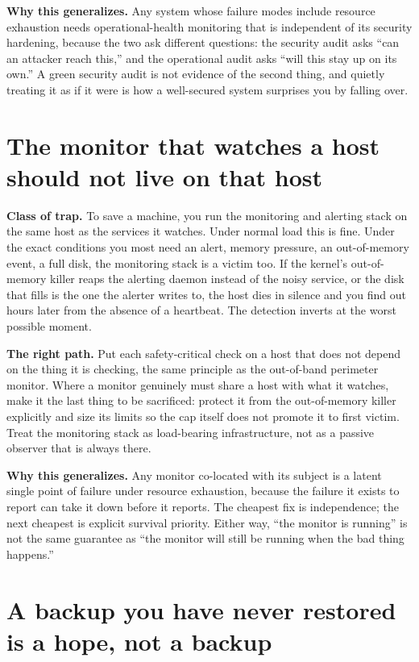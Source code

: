 \documentclass[12pt]{article}
\begin{document}
\textbf{Why this generalizes.} Any system whose failure modes include resource exhaustion needs operational-health monitoring that is independent of its security hardening, because the two ask different questions: the security audit asks ``can an attacker reach this,'' and the operational audit asks ``will this stay up on its own.'' A green security audit is not evidence of the second thing, and quietly treating it as if it were is how a well-secured system surprises you by falling over.

\section{The monitor that watches a host should not live on that host}

\textbf{Class of trap.} To save a machine, you run the monitoring and alerting stack on the same host as the services it watches. Under normal load this is fine. Under the exact conditions you most need an alert, memory pressure, an out-of-memory event, a full disk, the monitoring stack is a victim too. If the kernel's out-of-memory killer reaps the alerting daemon instead of the noisy service, or the disk that fills is the one the alerter writes to, the host dies in silence and you find out hours later from the absence of a heartbeat. The detection inverts at the worst possible moment.

\textbf{The right path.} Put each safety-critical check on a host that does not depend on the thing it is checking, the same principle as the out-of-band perimeter monitor. Where a monitor genuinely must share a host with what it watches, make it the last thing to be sacrificed: protect it from the out-of-memory killer explicitly and size its limits so the cap itself does not promote it to first victim. Treat the monitoring stack as load-bearing infrastructure, not as a passive observer that is always there.

\textbf{Why this generalizes.} Any monitor co-located with its subject is a latent single point of failure under resource exhaustion, because the failure it exists to report can take it down before it reports. The cheapest fix is independence; the next cheapest is explicit survival priority. Either way, ``the monitor is running'' is not the same guarantee as ``the monitor will still be running when the bad thing happens.''

\section{A backup you have never restored is a hope, not a backup}
\end{document}
